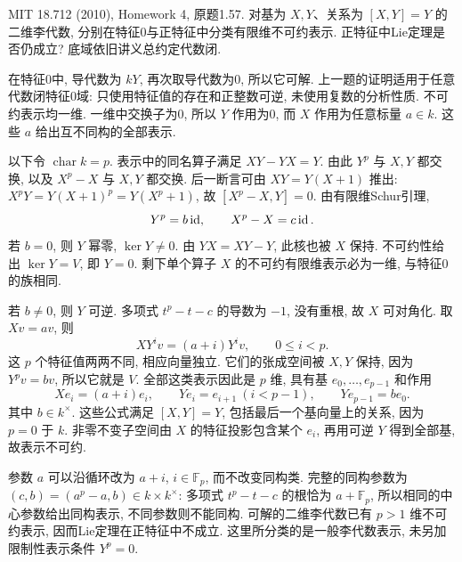 \begin{exercise}\label{hw:1.57}
MIT 18.712 (2010), Homework 4, 原题1.57. 对基为 $X,Y$、关系为 $[X,Y]=Y$ 的二维李代数, 分别在特征0与正特征中分类有限维不可约表示. 正特征中Lie定理是否仍成立? 底域依旧讲义总约定代数闭.
\end{exercise}
\begin{solution}
在特征0中, 导代数为 $kY$, 再次取导代数为0, 所以它可解. 上一题的证明适用于任意代数闭特征0域: 只使用特征值的存在和正整数可逆, 未使用复数的分析性质. 不可约表示均一维. 一维中交换子为0, 所以 $Y$ 作用为0, 而 $X$ 作用为任意标量 $a\in k$. 这些 $a$ 给出互不同构的全部表示.

以下令 $\operatorname{char}k=p$. 表示中的同名算子满足 $XY-YX=Y$. 由此 $Y^p$ 与 $X,Y$ 都交换, 以及 $X^p-X$ 与 $X,Y$ 都交换. 后一断言可由 $XY=Y(X+1)$ 推出: $X^pY=Y(X+1)^p=Y(X^p+1)$, 故 $[X^p-X,Y]=0$. 由有限维Schur引理,
\[
Y^p=b\operatorname{id},\qquad X^p-X=c\operatorname{id}.
\]
若 $b=0$, 则 $Y$ 幂零, $\ker Y\ne0$. 由 $YX=XY-Y$, 此核也被 $X$ 保持. 不可约性给出 $\ker Y=V$, 即 $Y=0$. 剩下单个算子 $X$ 的不可约有限维表示必为一维, 与特征0的族相同.

若 $b\ne0$, 则 $Y$ 可逆. 多项式 $t^p-t-c$ 的导数为 $-1$, 没有重根, 故 $X$ 可对角化. 取 $Xv=av$, 则
\[
XY^iv=(a+i)Y^iv,\qquad 0\le i<p.
\]
这 $p$ 个特征值两两不同, 相应向量独立. 它们的张成空间被 $X,Y$ 保持, 因为 $Y^pv=bv$, 所以它就是 $V$. 全部这类表示因此是 $p$ 维, 具有基 $e_0,\ldots,e_{p-1}$ 和作用
\[
Xe_i=(a+i)e_i,\qquad Ye_i=e_{i+1}\ (i<p-1),
\qquad Ye_{p-1}=be_0.
\]
其中 $b\in k^\times$. 这些公式满足 $[X,Y]=Y$, 包括最后一个基向量上的关系, 因为 $p=0$ 于 $k$. 非零不变子空间由 $X$ 的特征投影包含某个 $e_i$, 再用可逆 $Y$ 得到全部基, 故表示不可约.

参数 $a$ 可以沿循环改为 $a+i$, $i\in\mathbb F_p$, 而不改变同构类. 完整的同构参数为 $(c,b)=(a^p-a,b)\in k\times k^\times$: 多项式 $t^p-t-c$ 的根恰为 $a+\mathbb F_p$, 所以相同的中心参数给出同构表示, 不同参数则不能同构. 可解的二维李代数已有 $p>1$ 维不可约表示, 因而Lie定理在正特征中不成立. 这里所分类的是一般李代数表示, 未另加限制性表示条件 $Y^p=0$.
\end{solution}

